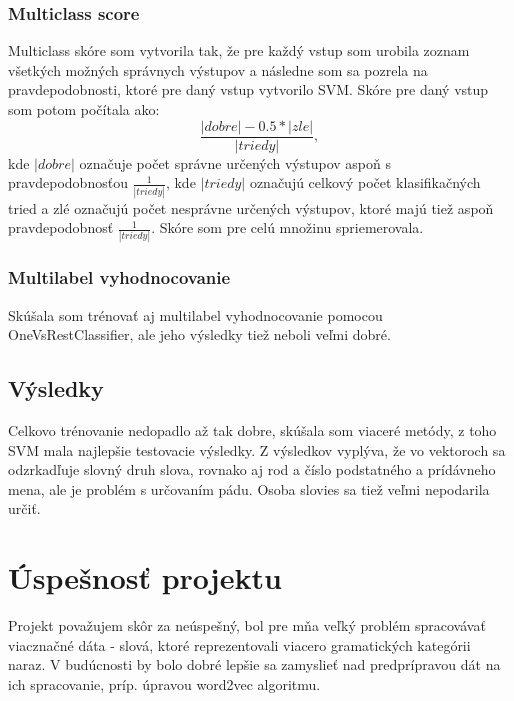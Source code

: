 \documentclass[12pt]{article}
\begin{document}
\subsubsection{Multiclass score}
Multiclass skóre som vytvorila tak, že pre každý vstup som urobila zoznam všetkých možných správnych výstupov a následne som sa pozrela na pravdepodobnosti, ktoré pre daný vstup vytvorilo SVM. Skóre pre daný vstup som potom počítala ako:
\[\frac{|dobre|-0.5*|zle|}{|triedy|},\]
kde $|dobre|$ označuje počet správne určených výstupov aspoň s pravdepodobnosťou $\frac{1}{|triedy|}$, kde $|triedy|$ označujú celkový počet klasifikačných tried a zlé označujú počet nesprávne určených výstupov, ktoré majú tiež aspoň pravdepodobnosť $\frac{1}{|triedy|}$. Skóre som pre celú množinu spriemerovala. 


\subsubsection{Multilabel vyhodnocovanie}
Skúšala som trénovať aj multilabel vyhodnocovanie pomocou OneVsRestClassifier, ale jeho výsledky tiež neboli veľmi dobré. 

\subsection{Výsledky}
Celkovo trénovanie nedopadlo až tak dobre, skúšala som viaceré metódy, z toho SVM mala najlepšie testovacie výsledky. Z výsledkov vyplýva, že vo vektoroch sa odzrkadľuje slovný druh slova, rovnako aj rod a číslo podstatného a prídávneho mena, ale je problém s určovaním pádu. Osoba slovies sa tiež veľmi nepodarila určiť. 

\section{Úspešnosť projektu}
Projekt považujem skôr za neúspešný, bol pre mňa veľký problém spracovávať viacznačné dáta - slová, ktoré reprezentovali viacero gramatických kategórii naraz. V budúcnosti by bolo dobré lepšie sa zamyslieť nad predprípravou dát na ich spracovanie, príp. úpravou word2vec algoritmu. 
\end{document}
